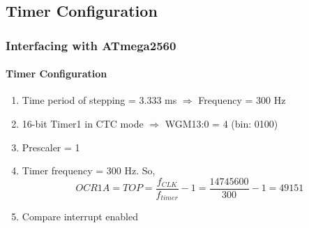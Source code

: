 \documentclass[table,10pt,red]{beamer}	%
\begin{document}
\subsection{Timer Configuration}

\begin{frame}
	\frametitle{Interfacing with ATmega2560}
	\framesubtitle{Timer Configuration}
	\pause
	\begin{enumerate}[$\checkmark$]
		\item <+-|alert@+> Time period of stepping = 3.333 ms $\Rightarrow$ Frequency = 300 Hz
		\item <+-|alert@+> 16-bit Timer1 in CTC mode $\Rightarrow$ WGM13:0 = 4 (bin: 0100)
		\item <+-|alert@+> Prescaler = 1
		\item <+-|alert@+> Timer frequency = 300 Hz. So, $$ OCR1A = TOP = \frac{f_{CLK}}{f_{timer}} - 1 = \frac{14745600}{300} - 1 = 49151$$
		\item <+-|alert@+> Compare interrupt enabled
	\end{enumerate}
\end{frame}
\end{document}
